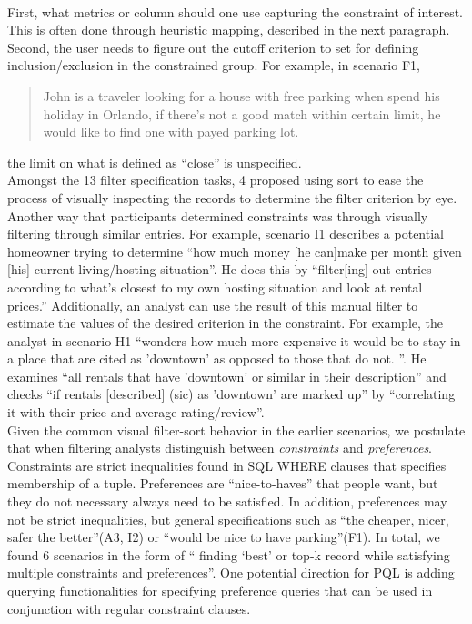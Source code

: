 \documentclass{sig-alternate-05-2015}
\begin{document}
\\ First, what metrics or column should one use capturing the constraint of interest. This is often done through heuristic mapping, described in the next paragraph. Second, the user needs to figure out the cutoff criterion to set for defining inclusion/exclusion in the constrained group. For example, in scenario F1, 
\begin{quote}
John is a traveler looking for a house with free parking when spend his holiday in Orlando, if there's not a good match within certain limit, he would like to find one with payed parking lot.  
\end{quote}
the limit on what is defined as ``close'' is unspecified.  
\\ Amongst the 13 filter specification tasks, 4 proposed using sort to ease the process of visually inspecting the records to determine the filter criterion by eye. Another way that participants determined constraints was through visually filtering through similar entries. For example, scenario I1 describes a potential homeowner trying to determine ``how much money [he can]make per month given [his] current living/hosting situation''. He does this by ``filter[ing] out entries according to what's closest to my own hosting situation and look at rental prices.'' Additionally, an analyst can use the result of this manual filter to estimate the values of the desired criterion in the constraint.  For example, the analyst in scenario H1 ``wonders how much more expensive it would be to stay in a place that are cited as 'downtown' as opposed to those that do not. ''. He examines ``all rentals that have 'downtown' or similar in their description'' and checks ``if rentals [described] (sic) as 'downtown' are marked up'' by ``correlating it with their price and average rating/review''.
\\ Given the common visual filter-sort behavior in the earlier scenarios, we postulate that when filtering analysts distinguish between \textit{constraints} and \textit{preferences}. Constraints are strict inequalities found in SQL WHERE clauses that specifies membership of a tuple. Preferences are ``nice-to-haves'' that people want, but they do not necessary always need to be satisfied. In addition, preferences may not be strict inequalities, but general specifications such as ``the cheaper, nicer, safer the better''(A3, I2) or ``would be nice to have parking''(F1). In total, we found 6 scenarios in the form of `` finding `best' or top-k record while satisfying multiple constraints and preferences''. One potential direction for PQL is adding querying functionalities for specifying preference queries that can be used in conjunction with regular constraint clauses. 
\end{document}
